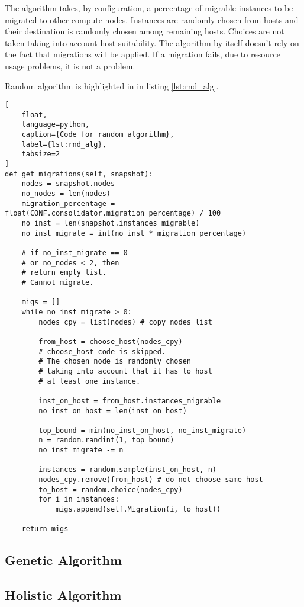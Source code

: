 The algorithm takes, by configuration, a percentage of migrable instances to be migrated to other compute nodes. Instances are randomly chosen from hosts and their destination is randomly chosen among remaining hosts. Choices are not taken taking into account host suitability. The algorithm by itself doesn't rely on the fact that migrations will be applied. If a migration fails, due to resource usage problems, it is not a problem.

Random algorithm is highlighted in in listing \ref{lst:rnd_alg}.

\begin{lstlisting}[
	float,
	language=python,
	caption={Code for random algorithm},
	label={lst:rnd_alg},
	tabsize=2
]
def get_migrations(self, snapshot):
	nodes = snapshot.nodes
	no_nodes = len(nodes)
	migration_percentage = float(CONF.consolidator.migration_percentage) / 100
	no_inst = len(snapshot.instances_migrable)
	no_inst_migrate = int(no_inst * migration_percentage)

	# if no_inst_migrate == 0
	# or no_nodes < 2, then
	# return empty list.
	# Cannot migrate.

	migs = []
	while no_inst_migrate > 0:
		nodes_cpy = list(nodes) # copy nodes list

		from_host = choose_host(nodes_cpy)
		# choose_host code is skipped.
		# The chosen node is randomly chosen
		# taking into account that it has to host
		# at least one instance.

		inst_on_host = from_host.instances_migrable
		no_inst_on_host = len(inst_on_host)

		top_bound = min(no_inst_on_host, no_inst_migrate)
		n = random.randint(1, top_bound)
		no_inst_migrate -= n

		instances = random.sample(inst_on_host, n)
		nodes_cpy.remove(from_host) # do not choose same host
		to_host = random.choice(nodes_cpy)
		for i in instances:
			migs.append(self.Migration(i, to_host))

	return migs
\end{lstlisting}

\subsection{Genetic Algorithm}
\label{sub:algs_rnd}

\subsection{Holistic Algorithm}
\label{sub:algs_rnd}